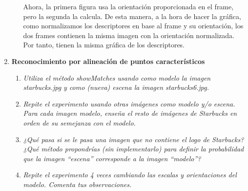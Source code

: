 \documentclass{article}
\begin{document}
\begin{enumerate}
\begin{enumerate}
Ahora, la primera figura usa la orientación proporcionada en el frame, pero la segunda la calcula. De esta manera, a la hora de hacer la gráfica, como normalizamos los descriptores en base al frame y su orientación, los dos frames contienen la misma imagen con la orientación normalizada. Por tanto, tienen la misma gráfica de los descriptores.

 \end{enumerate}

\newpage

 \item \textbf{ Reconocimiento por alineación de puntos característicos}

 \begin{enumerate}
 \item \textit{Utiliza  el  método  showMatches usando  como  modelo  la  imagen 
 starbucks.jpg y como (nueva) escena la imagen starbucks6.jpg.}

 \item \textit{Repite el experimento  usando otras imágenes  como modelo  y/o escena. 
Para cada imagen modelo, enseña el  resto de imágenes de Starbucks en orden de su semejanza con el modelo.}

 \item \textit{¿Qué pasa si se le pasa una imagen que no contiene el logo de Starbucks? 
¿Qué  método  propondrías  (sin  implementarlo)  para  definir la 
probabilidad que la imagen “escena” corresponde a la imagen “modelo”?}

 \item \textit {Repite el experimento 4 veces cambiando las escalas y orientaciones del 
modelo. Comenta tus observaciones.}
 
 \end{enumerate}

\end{enumerate}
\end{document}
